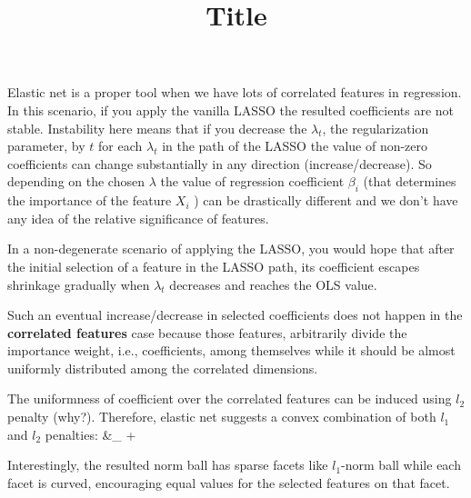 \documentclass[]{article}
\title{Title}
\begin{document}
	
		Elastic net is a proper tool when we have lots of correlated features in regression. In this scenario, if you apply the vanilla LASSO the resulted coefficients are not stable. Instability here means that if you decrease the $\lambda_t$, the regularization parameter, by $t$ for each $\lambda_t$ in the path of the LASSO the value of non-zero coefficients can change substantially in any direction (increase/decrease). So depending on the chosen $\lambda$ the value of regression coefficient $\beta_i$ (that determines the importance of the feature $X_i$ ) can be drastically different and we don't have any idea of the relative significance of features.
		
		In a non-degenerate scenario of applying the LASSO, you would hope that after the initial selection of a feature in the LASSO path, its coefficient escapes shrinkage gradually when $\lambda_t$ decreases and reaches the OLS value.
		
		Such an eventual increase/decrease in selected coefficients does not happen in the {\bf correlated features} case because those features, arbitrarily divide the importance weight, i.e., coefficients, among themselves while it should be almost uniformly distributed among the correlated dimensions.
		
		The uniformness of coefficient over the correlated features can be induced using $l_2$ penalty (why?). Therefore, elastic net suggests a convex combination of both $l_1$ and $l_2$ penalties:
		\be
		\hat{\beta} &\in \argmin_{\beta}   + \lambda {} 
		\\ 
		\ee 
		
		Interestingly, the resulted norm ball has sparse facets like $l_1$-norm ball while each facet is curved, encouraging equal values for the selected features on that facet.
			
\end{document}
